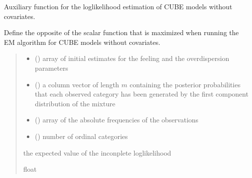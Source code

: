 \documentclass[letterpaper,10pt,english]{sphinxmanual}
\begin{document}
\begin{fulllineitems}
\label{\detokenize{cubmods:cubmods.cube.effecube}}
\pysigstartsignatures
{}
\pysigstopsignatures
\sphinxAtStartPar
Auxiliary function for the log\sphinxhyphen{}likelihood estimation of CUBE models without covariates.

\sphinxAtStartPar
Define the opposite of the scalar function that is maximized when running the E\sphinxhyphen{}M 
algorithm for CUBE models without covariates.
\begin{quote}\begin{description}
\begin{itemize}
\item {} 
\sphinxAtStartPar
{} () \textendash{} array of initial estimates for the feeling and the overdispersion parameters

\item {} 
\sphinxAtStartPar
{} () \textendash{} a column vector of length \(m\) containing the posterior
probabilities that each observed category has been generated by the first component distribution 
of the mixture

\item {} 
\sphinxAtStartPar
{} () \textendash{} array of the absolute frequencies of the observations

\item {} 
\sphinxAtStartPar
{} () \textendash{} number of ordinal categories

\end{itemize}

\sphinxAtStartPar
the expected value of the inconplete log\sphinxhyphen{}likelihood

\sphinxAtStartPar
float

\end{description}\end{quote}

\end{fulllineitems}
\end{document}
